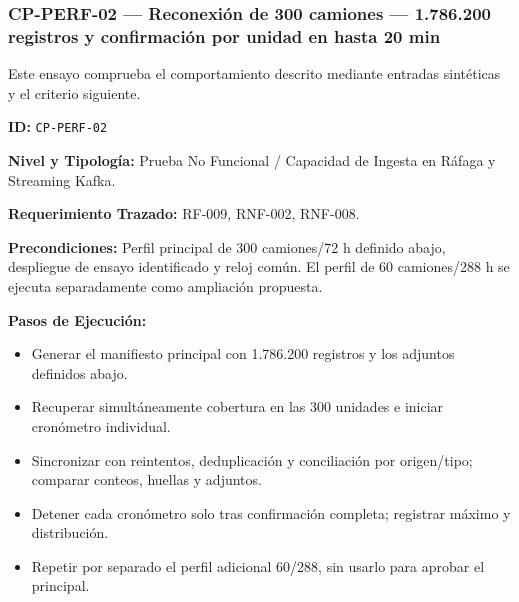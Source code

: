 \subsubsection*{CP-PERF-02 — Reconexión de 300 camiones — 1.786.200 registros y confirmación por unidad en hasta 20 min}\label{sec:9-cp-perf-02}

Este ensayo comprueba el comportamiento descrito mediante entradas sintéticas y el criterio siguiente.

\par\noindent\textbf{ID:} \texttt{CP-\allowbreak{}PERF-\allowbreak{}02}\par
\par\noindent\textbf{Nivel y Tipología:} Prueba No Funcional / Capacidad de Ingesta en Ráfaga y Streaming Kafka.\par
\par\noindent\textbf{Requerimiento Trazado:} RF-009, RNF-002, RNF-008.\par
\par\noindent\textbf{Precondiciones:} Perfil principal de 300 camiones/72 h definido abajo, despliegue de ensayo identificado y reloj común. El perfil de 60 camiones/288 h se ejecuta separadamente como ampliación propuesta.\par
\par\noindent\textbf{Pasos de Ejecución:}\par
\begin{itemize}
\item Generar el manifiesto principal con 1.786.200 registros y los adjuntos definidos abajo.
\item Recuperar simultáneamente cobertura en las 300 unidades e iniciar cronómetro individual.
\item Sincronizar con reintentos, deduplicación y conciliación por origen/tipo; comparar conteos, huellas y adjuntos.
\item Detener cada cronómetro solo tras confirmación completa; registrar máximo y distribución.
\item Repetir por separado el perfil adicional 60/288, sin usarlo para aprobar el principal.
\end{itemize}

